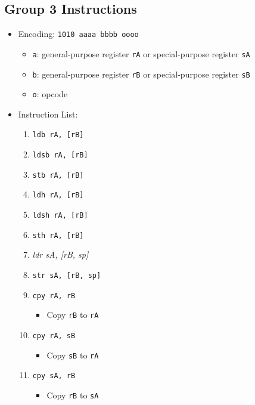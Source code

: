 \documentclass{article}
\begin{document}
	\subsection{Group 3 Instructions}
		\begin{itemize}
		\item Encoding:  \texttt{1010 aaaa bbbb oooo}
			\begin{itemize}
			\item \texttt{a}:  general-purpose register \texttt{rA} or
				special-purpose register \texttt{sA}
			\item \texttt{b}:  general-purpose register \texttt{rB} or
				special-purpose register \texttt{sB}
			\item \texttt{o}:  opcode
			\end{itemize}
		\item Instruction List:
			\begin{enumerate}
			\item \texttt{ldb rA, [rB]}
			\item \texttt{ldsb rA, [rB]}
			\item \texttt{stb rA, [rB]}
			\item \texttt{ldh rA, [rB]}

			\item \texttt{ldsh rA, [rB]}
			\item \texttt{sth rA, [rB]}
			\item \textit{ldr sA, [rB, sp]}
			\item \texttt{str sA, [rB, sp]}

			\item \texttt{cpy rA, rB}
				\begin{itemize}
				\item Copy \texttt{rB} to \texttt{rA}
				\end{itemize}

			\item \texttt{cpy rA, sB}
				\begin{itemize}
				\item Copy \texttt{sB} to \texttt{rA}
				\end{itemize}
			\item \texttt{cpy sA, rB}
				\begin{itemize}
				\item Copy \texttt{rB} to \texttt{sA}
				\end{itemize}


\end{enumerate}
\end{itemize}
\end{document}
